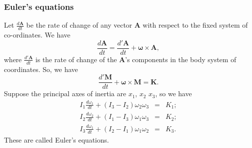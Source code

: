 \subsubsection{Euler's equations}
Let $\frac{d\bm{A}}{dt}$ be the rate of change of any vector $\bm{A}$ with respect to the fixed system of co-ordinates. We have
\[\frac{d\bm{A}}{dt} = \frac{d'\bm{A}}{dt} + \bm{\omega} \times \bm{A}, \]
where
$\frac{d'\bm{A}}{dt}$ is the rate of change of the $\bm{A}$'s components in the body system of coordinates. So, we have
\[\frac{d'\bm{M}}{dt} + \bm{\omega} \times \bm{M} = \bm{K}.\]
Suppose the principal axes of inertia are $x_1$, $x_2$ $x_3$, so we have
\begin{eqnarray}
I_1 \frac{d\omega_1}{dt} + (I_3-I_2)\omega_2\omega_3 &=& K_1 ;\nonumber \\
I_2 \frac{d\omega_2}{dt} + (I_1-I_3)\omega_1\omega_3 &=& K_2 ;\nonumber \\
I_3 \frac{d\omega_1}{dt} + (I_2-I_1)\omega_1\omega_2 &=& K_3 .\nonumber
\end{eqnarray}
These are called Euler's equations.

